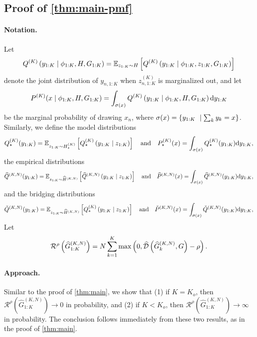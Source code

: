 \subsection{Proof of \cref{thm:main-pmf}}

\paragraph{Notation.}
Let
\[
  Q^{(K)}\left({y}_{1:K}\mid{\phi}_{1:K},H,G_{1:K}\right)=
  \mathbb{E}_{z_{1:K}\sim H}\left[Q^{(K)}\left({y}_{1:K}\mid{\phi}_{1:K},z_{1:K},G_{1:K}\right)\right]
\]
denote the joint distribution of ${y}_{n,1:K}$ when $z^{(K)}_{n,1:K}$ is marginalized out, and let
\[
	P^{(K)}({x}\mid{\phi}_{1:K},H,G_{1:K})
  =\int_{\sigma({x})}Q^{(K)}\lrp{{y}_{1:K}\mid{\phi}_{1:K},H,G_{1:K}}\d{y}_{1:K}
\]
be the marginal probability of drawing ${x}_{n}$, where $\sigma({x})=\left\{{y}_{1:K}\ \mid \sum_{k}{y}_{k}={x}\right\}$.
Similarly, we define the model distributions
\[
	Q^{(K)}_{\star}({y}_{1:K})=
  \mathbb{E}_{z_{1:K}\sim H^{(K)}_{\star}}\lrb{Q^{(K)}_{\star}\lrp{{y}_{1:K}\mid z_{1:K}}} \quad\text{and}\quad
	P^{(K)}_{\star}({x})=
	\int_{\sigma({x})}Q^{(K)}_{\star}({y}_{1:K})\d{y}_{1:K},
\]
the empirical distributions
\[
	\widehat{Q}^{(K,N)}({y}_{1:K}) = \mathbb{E}_{z_{1:K}\sim\widehat{H}^{(K,N)}}\lrb{\widehat{Q}^{(K,N)}\lrp{{y}_{1:K}\mid z_{1:K}}}
    \quad\text{and}\quad
  \widehat{P}^{(K,N)}({x}) =
	\int_{\sigma({x})}\widehat{Q}^{(K,N)}({y}_{1:K})\d{y}_{1:K},
\]
and the bridging distributions
\[
	\check{Q}^{(K,N)}({y}_{1:K})=
\mathbb{E}_{z_{1:K}\sim\widehat{H}^{(K,N)}}\lrb{Q^{(K)}_{\star}\lrp{{y}_{1:K}\mid z_{1:K}}}
 \quad\text{and}\quad
  \check{P}^{(K,N)}({x})=
	\int_{\sigma({x})}\check{Q}^{(K,N)}({y}_{1:K})\d{y}_{1:K},
\]
Let
\[
	\mathcal{R}^{\rho}\left(\widehat{G}^{(K,N)}_{1:K}\right)
	=N\sum^{K}_{k=1}\mathop{\mathrm{max}}\left(0, \widehat{\mathcal{D}}\left(\widehat{G}^{(K,N)}_{k},G\right)-\rho\right).
\]

\paragraph{Approach.}
Similar to the proof of \cref{thm:main}, we show that 
(1) if $K=K_{o}$, then $\mathcal{R}^{\rho}(\widehat{G}^{(K,N)}_{1:K}) \to 0$ in probability, and 
(2) if $K<K_{o}$, then $\mathcal{R}^{\rho}(\widehat{G}^{(K,N)}_{1:K}) \to\infty$ in probability. 
The conclusion follows immediately from these two results, as 
in the proof of \cref{thm:main}. 

